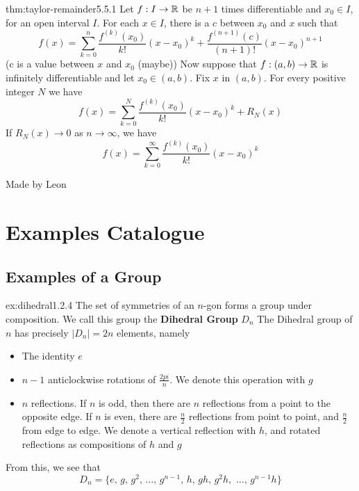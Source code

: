 \documentclass[landscape, 8pt]{extarticle}
\begin{document}
\begin{multicols}{3}
\begin{thm}{thm:taylor-remainder}{5.5.1}
    Let $f:I\to\mathbb{R}$ be $n+1$ times differentiable and $x_{0}\in I$, for an open interval $I$. For each $x \in I$, there is a $c$ between $x_{0}$ and $x$ such that
    \[f(x)=\sum_{k=0}^{n} \frac{f^{(k)}(x_{0})}{k!} (x-x_{0})^k + \frac{f^{(n+1)}(c)}{(n+1)!}(x-x_{0})^{n+1}\]
    (c is a value between $x$ and $x_{0}$ (maybe))
    \vspace{0pt}\newline
    Now suppose that $f:(a,b)\to\mathbb{R}$ is infinitely differentiable and let $x_{0}\in (a,b)$. Fix $x$ in $(a,b)$. For every positive integer $N$ we have
    \[f(x)=\sum_{k=0}^{N} \frac{f^{(k)}(x_{0})}{k!}(x-x_{0})^{k} + R_{N}(x)\]
    If $R_{N}(x) \to 0$ as $n\to\infty$, we have
    \[f(x) = \sum_{k=0}^{\infty} \frac{f^{(k)}(x_{0})}{k!}(x-x_{0})^{k}\]
\end{thm}
\vspace{-8pt}
Made by Leon
\newpage




\section{Examples Catalogue}

\subsection*{Examples of a Group}

\begin{xmp}{ex:dihedral}{1.2.4}
The set of symmetries of an $n$-gon forms a group under composition. We call this group the \textbf{Dihedral Group} $D_{n}$
\vspace{0pt}\newline
The Dihedral group of $n$ has precisely $\lvert D_{n} \rvert = 2n$ elements, namely
\renewcommand\labelitemi{\tiny$\bullet$}
\begin{itemize}
    \setlength\itemsep{0em}
    \item The identity $e$
    \item $n- 1$ anticlockwise rotations of $\frac{2pi}{n}$. We denote this operation with $g$
    \item $n$ reflections. If $n$ is odd, then there are $n$ reflections from a point to the opposite edge. If $n$ is even, there are $\frac{n}{2}$ reflections from point to point, and $\frac{n}{2}$ from edge to edge. We denote a vertical reflection with $h$, and rotated reflections as compositions of $h$ and $g$ 
\end{itemize}
From this, we see that
\[D_{n} = \{e,\,g,\,g^{2},\,\dots,\,g^{n-1},\, h,\, gh,\, g^{2}h,\,\,\dots,\, g^{n-1}h \}\]
\end{xmp}
\vspace{-5pt}


\end{multicols}
\end{document}
